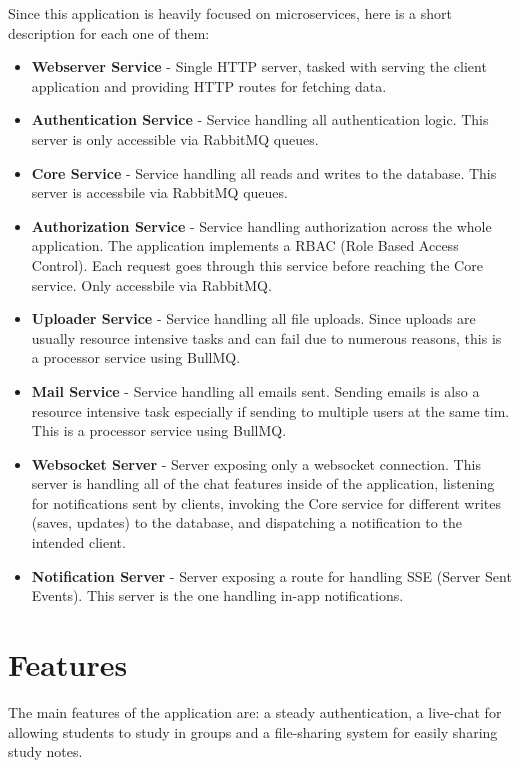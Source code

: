 Since this application is heavily focused on microservices, here is a short description for each one of them:
\begin{itemize}
    \item \textbf{Webserver Service} - Single HTTP server, tasked with serving the client application and providing HTTP routes for fetching data.
    \item \textbf{Authentication Service} - Service handling all authentication logic. This server is only accessible via RabbitMQ queues.
    \item \textbf{Core Service} - Service handling all reads and writes to the database. This server is accessbile via RabbitMQ queues.
    \item \textbf{Authorization Service} - Service handling authorization across the whole application. The application implements a RBAC (Role Based Access Control). Each request goes through this service before reaching the Core service. Only accessbile via RabbitMQ.
    \item \textbf{Uploader Service} - Service handling all file uploads. Since uploads are usually resource intensive tasks and can fail due to numerous reasons, this is a processor service using BullMQ.
    \item \textbf{Mail Service} - Service handling all emails sent. Sending emails is also a resource intensive task especially if sending to multiple users at the same tim. This is a processor service using BullMQ.
    \item \textbf{Websocket Server} - Server exposing only a websocket connection. This server is handling all of the chat features inside of the application, listening for notifications sent by clients, invoking the Core service for different writes (saves, updates) to the database, and dispatching a notification to the intended client.
    \item \textbf{Notification Server} - Server exposing a route for handling SSE (Server Sent Events). This server is the one handling in-app notifications. 
\end{itemize}

\section{Features}
The main features of the application are: a steady authentication, a live-chat for allowing students to study in groups and a file-sharing system for easily sharing study notes.

